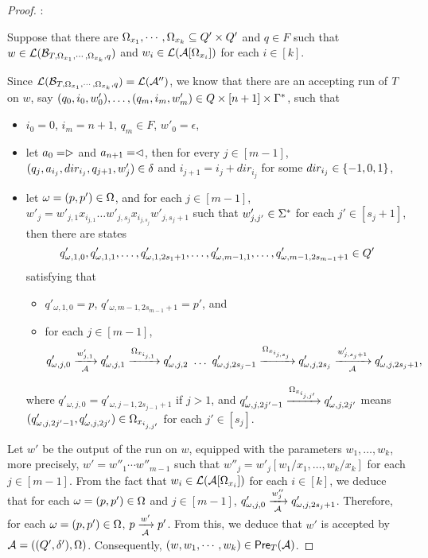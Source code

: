 \begin{proof}
\smallskip

: 

\smallskip

Suppose that there are $\Omega_{x_1},\cdots, \Omega_{x_k} \subseteq Q' \times Q'$ and $q \in F$ such that $w \in \mathcal{L}(\mathcal{B}_{T, \Omega_{x_1}, \cdots, \Omega_{x_k}, q})$ and $w_i \in \mathcal{L}(\mathcal{A}[\Omega_{x_i}])$ for each $i \in [k]$. 

Since $\mathcal{L}(\mathcal{B}_{T, \Omega_{x_1}, \cdots, \Omega_{x_k}, q})=\mathcal{L}(\mathcal{A}'')$, we know that  there are an accepting run of $T$ on $w$, 
say $(q_0, i_0, w'_0),\ldots, (q_m, i_m, w'_m) \in Q \times [n+1] \times \Gamma^*$, such that 
\begin{itemize}
\item $i_0=0$, $i_m = n+1$, $q_m \in F$, $w'_0 = \epsilon$,
%
\item let $a_0 = \vartriangleright$ and $a_{n+1} = \vartriangleleft$,  then for every $j \in [m-1]$, $(q_j, a_{i_j}, dir_{i_j}, q_{j+1}, w'_j) \in
        \delta$ and $i_{j+1} = i_j + dir_{i_j}$ for some $dir_{i_j} \in \{-1, 0, 1\}$, 
 \item  let $\omega =(p, p') \in \Omega$,  and for each $j \in [m-1]$, $w'_j = w'_{j, 1} x_{i_{j, 1}} \ldots w'_{j, s_j} x_{i_{j, s_j}} w'_{j, s_j + 1}$ such that $w'_{j, j'} \in \Sigma^*$ for each $j' \in [s_j+1]$, then there are states 
 $$q'_{\omega, 1, 0}, q'_{\omega, 1,1}, \ldots, q'_{\omega, 1, 2s_1 +1}, \ldots,  q'_{\omega, m-1, 1},  \ldots, q'_{\omega, m-1, 2s_{m-1} +1} \in Q'$$
 satisfying that 
 \begin{itemize}
\item $q'_{\omega, 1, 0} = p$, $q'_{\omega, m-1, 2s_{m-1} +1} = p'$, and 
%
\item for each $j \in [m-1]$, 
{\small
$$q'_{\omega, j, 0} \xrightarrow[\Aut]{w'_{j, 1} } q'_{\omega, j, 1} \xrightarrow{\conacc_{x_{i_{j, 1}}}} q'_{\omega, j, 2}\ \ldots\ q'_{\omega, j, 2s_j-1} \xrightarrow{\conacc_{x_{i_{j, s_j}}}} q'_{\omega, j, 2s_j} \xrightarrow[\Aut]{w'_{j, s_j + 1}} q'_{\omega, j, 2s_j+1},$$ 
}
\end{itemize}
where $q'_{\omega, j, 0} = q'_{\omega, j-1, 2s_{j-1}+1}$ if $j > 1$, and $q'_{\omega, j, 2j'-1} \xrightarrow{\Omega_{x_{i_{j, j'}}}} q'_{\omega, j, 2j'}$ means $(q'_{\omega, j, 2j'-1} , q'_{\omega, j, 2j'}) \in \Omega_{x_{i_{j, j'}}}$ for each $j' \in [s_j]$.
\end{itemize}

Let $w'$ be the output of the run on $w$, equipped with the parameters $w_1,\ldots, w_k$, more precisely, $w' = w''_1 \cdots w''_{m-1}$ such that  $w''_j = w'_j[w_1/x_1, \ldots, w_k/x_k]$ for each $j \in  [m-1]$. From the fact that $w_i \in \mathcal{L}(\mathcal{A}[\Omega_{x_i}])$ for each $i \in [k]$, we deduce that for each $\omega = (p,p') \in \Omega$ and $j \in [m-1]$, $q'_{\omega, j, 0} \xrightarrow[\mathcal{A}]{w''_j} q'_{\omega, j, 2s_j+1}$.
Therefore, for each $\omega = (p,p') \in \Omega$, $p \xrightarrow[\mathcal{A}]{w'} p'$. From this, we deduce that $w'$ is accepted by $\mathcal{A}=((Q', \delta'), \Omega)$.
Consequently, $(w, w_1,\cdots, w_k) \in \textsf{Pre}_{T}(\mathcal{A})$.
\end{proof}






